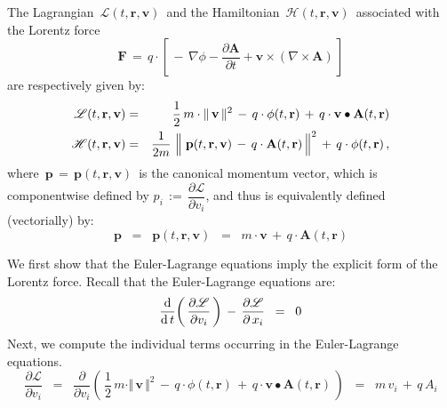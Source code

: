 \vskip 0.5cm
\begin{lemma}
\mbox{}
\vskip 0.02cm
\noindent
The Lagrangian
\,$\mathscr{L}(t, \mathbf{r}, \mathbf{v})$\,
and the Hamiltonian
\,$\mathscr{H}(t, \mathbf{r}, \mathbf{v})$\,
associated with the Lorentz force
\begin{equation*}
\mathbf{F}
\, = \,
    q \cdot
    \left[\,
        -\,\nabla\phi
        - \dfrac{\partial\mathbf{A}}{\partial t}
        + \mathbf{v} \times (\nabla \times \mathbf{A})
        \,\right]
\end{equation*}
are respectively given by:
\begin{eqnarray*}
\mathscr{L}(t, \mathbf{r}, \mathbf{v})
& = &
    \dfrac{1}{2}\,m\cdot\Vert\,\mathbf{v}\,\Vert^2
    \, - \,
    q\cdot\phi(t,\mathbf{r})
    \, + \,
    q\cdot\mathbf{v} \bullet \mathbf{A}(t,\mathbf{r})
\\
\mathscr{H}(t, \mathbf{r}, \mathbf{v})
& = &
    \dfrac{1}{2m}\,\left\Vert\;
        \mathbf{p}(t,\mathbf{r},\mathbf{v})
        \, \overset{{\color{white}.}}{-} \,
        q\cdot\mathbf{A}(t,\mathbf{r})
        \,\right\Vert^{2}
    \, + \,
    q\cdot\phi(t,\mathbf{r})\,,
\end{eqnarray*}
where
\,$\mathbf{p} \,=\, \mathbf{p}(t,\mathbf{r},\mathbf{v})$\,
is the canonical momentum vector,
which is componentwise defined by
\;$p_{i} \,:=\, \dfrac{\partial\mathscr{L}}{\partial v_{i}}$,\;
and thus is equivalently defined (vectorially) by:
\begin{equation*}
\mathbf{p}
\;\; = \;\;
    \mathbf{p}(t,\mathbf{r},\mathbf{v})
\;\; = \;\;
    m\cdot\mathbf{v}
    \, + \,
    q\cdot\mathbf{A}(t,\mathbf{r})
\end{equation*}
\end{lemma}
\proof
We first show that the Euler-Lagrange equations
imply the explicit form of the Lorentz force.
Recall that the Euler-Lagrange equations are:
\begin{equation*}
\dfrac{\textnormal{d}}{\textnormal{d}\,t}\!\left(\,\dfrac{\partial\mathscr{L}}{\partial v_{i}}\,\right)
\, - \,
\dfrac{\partial\mathscr{L}}{\partial\,x_{i}}
\;\; = \;\;
    0
\end{equation*}
Next, we compute the individual terms occurring in the Euler-Lagrange equations.
\begin{equation*}
\dfrac{\partial\mathscr{L}}{\partial v_{i}}
\;\; = \;\;
    \dfrac{\partial}{\partial v_{i}}\!
    \left(\,
        \dfrac{1}{2}\,m\cdot\Vert\,\mathbf{v}\,\Vert^2
        \, - \,
        q\cdot\phi(t,\mathbf{r})
        \, + \,
        q\cdot\mathbf{v} \bullet \mathbf{A}(t,\mathbf{r})
        \,\right)
\;\; = \;\;
    m\,v_{i}
    \, + \,
    q\,A_{i}
\end{equation*}
